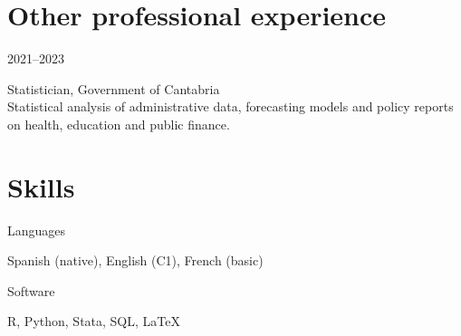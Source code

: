 \documentclass[11pt,a4paper]{article}
\newcommand{\entry}[2]{\begin{minipage}[t]{2.6cm}\sffamily\small\textcolor{muted}{#1}\end{minipage}%
  \begin{minipage}[t]{\linewidth-2.6cm}\raggedright #2\end{minipage}\par\vspace{4pt}}
\begin{document}
\section{Other professional experience}
\entry{2021–2023}{Statistician, Government of Cantabria\\{\small\color{muted}Statistical analysis of administrative data, forecasting models and policy reports on health, education and public finance.}}

\section{Skills}
\entry{Languages}{Spanish (native), English (C1), French (basic)}
\entry{Software}{R, Python, Stata, SQL, LaTeX}
\end{document}
